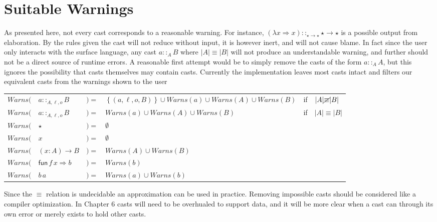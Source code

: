 \section{Suitable Warnings}

As presented here, not every cast corresponds to a reasonable warning.
For instance, $\left(\lambda x\Rightarrow x\right)::_{\star\rightarrow\star}\star\rightarrow\star$ is a possible output from elaboration.
By the rules given the cast will not reduce without input, it is however inert, and will not cause blame.
In fact since the user only interacts with the surface language, any cast $a::_{A}B$ where $|A|\equiv|B|$ will not produce an understandable warning, and further should not be a direct source of runtime errors.
A reasonable first attempt would be to simply remove the casts of the form $a::_{A}A$, but this ignores the possibility that casts themselves may contain casts.
Currently the implementation leaves most casts intact and filters our equivalent casts from the warnings shown to the user


\begin{tabular}{llllll}
$Warns($ & $a::_{A,\ensuremath{\ell},o}B$ & $)=$ & $\left\{ (a,\ensuremath{\ell},o,B)\right\} \cup Warns(a)\cup Warns(A)\cup Warns(B)$ & if & $|A|\cancel{\equiv}|B|$\tabularnewline
$Warns($ & $a::_{A,\ensuremath{\ell},o}B$ & $)=$ & $Warns(a)\cup Warns(A)\cup Warns(B)$ & if & $|A|\equiv|B|$\tabularnewline
$Warns($ & $\star$ & $)=$ & $\emptyset$ &  & \tabularnewline
$Warns($ & $x$ & $)=$ & $\emptyset$ &  & \tabularnewline
$Warns($ & $\left(x:A\right)\rightarrow B$ & $)=$ & $Warns(A)\cup Warns(B)$ &  & \tabularnewline
$Warns($ & $\mathsf{fun}\,f\,x\Rightarrow b$ & $)=$ & $Warns(b)$ &  & \tabularnewline
$Warns($ & $b\,a$ & $)=$ & $Warns(a)\cup Warns(b)$ &  & \tabularnewline
\end{tabular}

Since the $\equiv$ relation is undecidable an approximation can be used in practice.
Removing impossible casts should be considered like a compiler optimization.
In Chapter 6 casts will need to be overhualed to support data, and it will be more clear when a cast can through its own error or merely exists to hold other casts.
